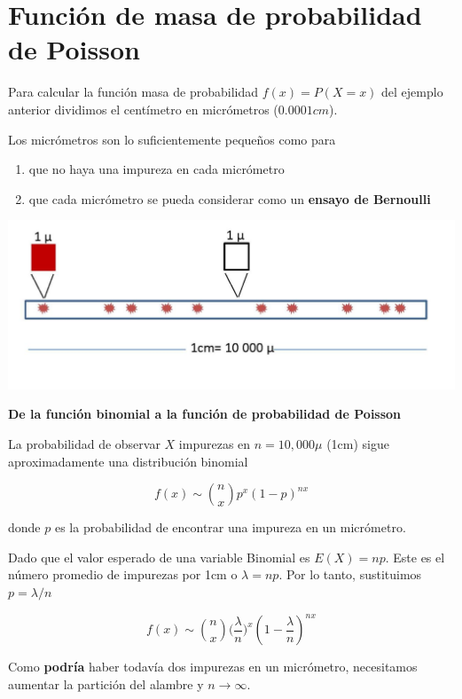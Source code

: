 \documentclass[
]{book}
\begin{document}
\hypertarget{funciuxf3n-de-masa-de-probabilidad-de-poisson}{%
\section{Función de masa de probabilidad de Poisson}\label{funciuxf3n-de-masa-de-probabilidad-de-poisson}}

Para calcular la función masa de probabilidad \(f(x)=P(X=x)\) del ejemplo anterior dividimos el centímetro en micrómetros (\(0.0001cm\)).

Los micrómetros son lo suficientemente pequeños como para

\begin{enumerate}
\def\labelenumi{\arabic{enumi})}
\item
  que no haya una impureza en cada micrómetro
\item
  que cada micrómetro se pueda considerar como un \textbf{ensayo de Bernoulli}
\end{enumerate}

\includegraphics{./figures/Pois.JPG}

\textbf{De la función binomial a la función de probabilidad de Poisson}

La probabilidad de observar \(X\) impurezas en \(n=10,000\mu\) (1cm) sigue aproximadamente una distribución binomial

\[f(x) \sim \binom nxp^x(1-p)^{nx}\]

donde \(p\) es la probabilidad de encontrar una impureza en un micrómetro.

Dado que el valor esperado de una variable Binomial es \(E(X)=np\). Este es el número promedio de impurezas por 1cm o \(\lambda=np\). Por lo tanto, sustituimos \(p=\lambda/n\)

\[f(x) \sim \binom nx \big(\frac{\lambda}{n}\big)^x(1-\frac{\lambda}{n})^{nx}\]

Como \textbf{podría} haber todavía dos impurezas en un micrómetro, necesitamos aumentar la partición del alambre y \(n \rightarrow \infty\).
\end{document}
